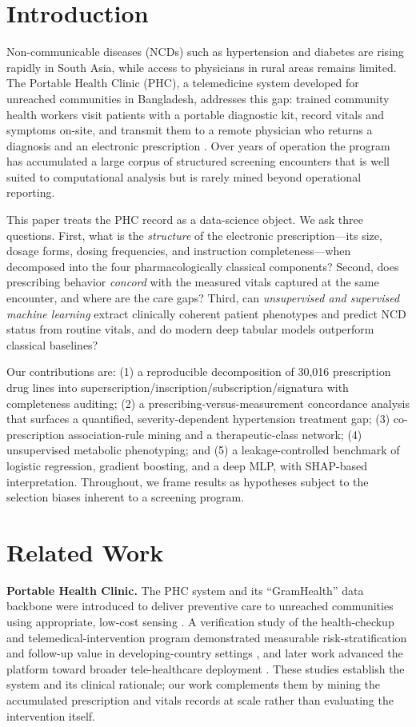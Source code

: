 \documentclass[conference]{IEEEtran}
\begin{document}
\section{Introduction}
Non-communicable diseases (NCDs) such as hypertension and diabetes are rising rapidly in South Asia, while access to physicians in rural areas remains limited. The Portable Health Clinic (PHC), a telemedicine system developed for unreached communities in Bangladesh, addresses this gap: trained community health workers visit patients with a portable diagnostic kit, record vitals and symptoms on-site, and transmit them to a remote physician who returns a diagnosis and an electronic prescription \cite{ahmed2014targeting,islam2019phc,ahmed2015phc}. Over years of operation the program has accumulated a large corpus of structured screening encounters that is well suited to computational analysis but is rarely mined beyond operational reporting.

This paper treats the PHC record as a data-science object. We ask three questions. First, what is the \emph{structure} of the electronic prescription---its size, dosage forms, dosing frequencies, and instruction completeness---when decomposed into the four pharmacologically classical components? Second, does prescribing behavior \emph{concord} with the measured vitals captured at the same encounter, and where are the care gaps? Third, can \emph{unsupervised and supervised machine learning} extract clinically coherent patient phenotypes and predict NCD status from routine vitals, and do modern deep tabular models outperform classical baselines?

Our contributions are: (1) a reproducible decomposition of 30{,}016 prescription drug lines into superscription/inscription/sub\-scription/signatura with completeness auditing; (2) a prescribing-versus-measurement concordance analysis that surfaces a quantified, severity-dependent hypertension treatment gap; (3) co-prescription association-rule mining and a therapeutic-class network; (4) unsupervised metabolic phenotyping; and (5) a leakage-controlled benchmark of logistic regression, gradient boosting, and a deep MLP, with SHAP-based interpretation. Throughout, we frame results as hypotheses subject to the selection biases inherent to a screening program.

\section{Related Work}
\textbf{Portable Health Clinic.} The PHC system and its ``GramHealth'' data backbone were introduced to deliver preventive care to unreached communities using appropriate, low-cost sensing \cite{ahmed2014targeting,ahmed2015phc}. A verification study of the health-checkup and tele\-medical-intervention program demonstrated measurable risk-stratification and follow-up value in developing-country settings \cite{nohara2015health}, and later work advanced the platform toward broader tele-healthcare deployment \cite{islam2019phc}. These studies establish the system and its clinical rationale; our work complements them by mining the accumulated prescription and vitals records at scale rather than evaluating the intervention itself.
\end{document}

